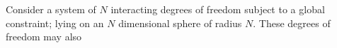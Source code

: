 Consider a system of $N$ interacting degrees of freedom subject to a global constraint; lying on an $N$ dimensional sphere of radius $N$. These degrees of freedom may also 